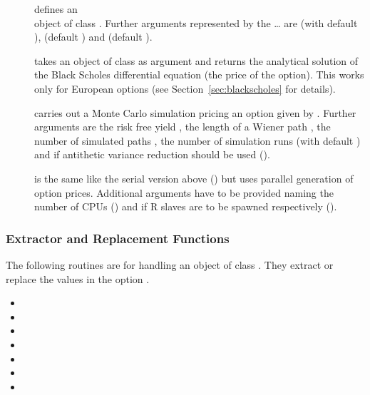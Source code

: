 \begin{description}
\item[]
  defines an \\object of class . Further arguments
  represented by the \ldots{} are  (with default
  ),  (default ) and
   (default ).
\item[] takes an object of class
   as argument and returns the analytical solution of
  the Black Scholes differential equation (the price of the
  option). This works only for European options (see
  Section~\ref{sec:blackscholes} for details).
\item[] carries out a Monte Carlo simulation pricing 
  an option given by . Further arguments are the risk free
  yield , the length of a Wiener path , the
  number of 
  simulated paths , the number of simulation runs
   (with default ) and if antithetic
  variance reduction should be used ().
\item[] is the same
  like the serial version above ()
  but uses parallel generation of
  option prices. Additional arguments have to be provided naming the
  number of CPUs ()
  and if R slaves are to be spawned respectively ().
\end{description}

\subsubsection{Extractor and Replacement Functions}

The following routines are for handling an object of class
. They
extract or replace the values in the option .

\begin{itemize}
\item {}
\item {}
\item {}
\item {}
\item {}
\item {}
\item {}
\end{itemize}

